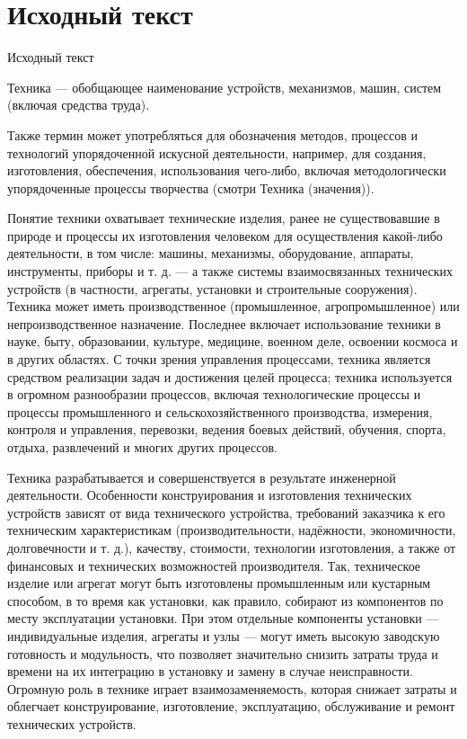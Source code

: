 \documentclass[a4paper, 14pt]{extarticle}
\begin{document}


\tableofcontents
\newpage

\section{Исходный текст}

Исходный текст

Техника — обобщающее наименование устройств, механизмов, машин, систем (включая средства труда).

Также термин может употребляться для обозначения методов, процессов и технологий упорядоченной искусной деятельности, например, для создания, изготовления, обеспечения, использования чего-либо, включая методологически упорядоченные процессы творчества (смотри Техника (значения)).

Понятие техники охватывает технические изделия, ранее не существовавшие в природе и процессы их изготовления человеком для осуществления какой-либо деятельности, в том числе: машины, механизмы, оборудование, аппараты, инструменты, приборы и т. д. — а также системы взаимосвязанных технических устройств (в частности, агрегаты, установки и строительные сооружения). Техника может иметь производственное (промышленное, агропромышленное) или непроизводственное назначение. Последнее включает использование техники в науке, быту, образовании, культуре, медицине, военном деле, освоении космоса и в других областях. С точки зрения управления процессами, техника является средством реализации задач и достижения целей процесса; техника используется в огромном разнообразии процессов, включая технологические процессы и процессы промышленного и сельскохозяйственного производства, измерения, контроля и управления, перевозки, ведения боевых действий, обучения, спорта, отдыха, развлечений и многих других процессов.

Техника разрабатывается и совершенствуется в результате инженерной деятельности. Особенности конструирования и изготовления технических устройств зависят от вида технического устройства, требований заказчика к его техническим характеристикам (производительности, надёжности, экономичности, долговечности и т. д.), качеству, стоимости, технологии изготовления, а также от финансовых и технических возможностей производителя. Так, техническое изделие или агрегат могут быть изготовлены промышленным или кустарным способом, в то время как установки, как правило, собирают из компонентов по месту эксплуатации установки. При этом отдельные компоненты установки — индивидуальные изделия, агрегаты и узлы — могут иметь высокую заводскую готовность и модульность, что позволяет значительно снизить затраты труда и времени на их интеграцию в установку и замену в случае неисправности. Огромную роль в технике играет взаимозаменяемость, которая снижает затраты и облегчает конструирование, изготовление, эксплуатацию, обслуживание и ремонт технических устройств.
\end{document}
